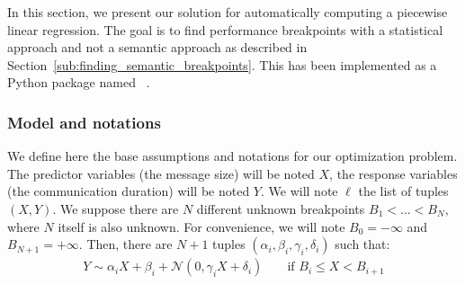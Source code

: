             In this section, we present our solution for automatically computing a piecewise linear regression. The goal
            is to find performance breakpoints with a statistical approach and not a semantic approach as described in
            Section~\ref{sub:finding_semantic_breakpoints}. This has been implemented as a Python package named
            \pyce~\cite{pycewise}.

            \subsubsection{Model and notations}%

                We define here the base assumptions and notations for our optimization problem. The predictor variables
                (\eg the message size) will be noted \(X\), the response variables (\eg the communication duration) will
                be noted \(Y\). We will note \(\ell\) the list of tuples \((X,Y)\). We suppose there are \(N\) different
                unknown breakpoints \(B_1 < \dots < B_N\), where \(N\) itself is also unknown. For convenience, we will
                note \(B_0=-\infty\) and \(B_{N+1} = +\infty\).  Then, there are \(N+1\) tuples \((\alpha_i, \beta_i,
                \gamma_i, \delta_i)\) such that:
                \begin{align}\label{eqn:prediction:pycewise_model}
                    Y \sim \alpha_i X + \beta_i + \mathcal{N}\left(0, \gamma_i X + \delta_i\right)
                        && \text{ if } B_i \leq X < B_{i+1}
                \end{align}

